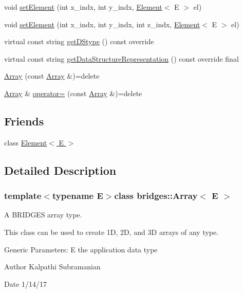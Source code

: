 \begin{DoxyCompactItemize}
void \hyperlink{classbridges_1_1_array_a428cc76d22af71c5ae57dc293780b8ec}{set\+Element} (int x\+\_\+indx, int y\+\_\+indx, \hyperlink{classbridges_1_1_element}{Element}$<$ E $>$ el)
\item 
void \hyperlink{classbridges_1_1_array_a526c3a190b48a338541e5b4667c5eedf}{set\+Element} (int x\+\_\+indx, int y\+\_\+indx, int z\+\_\+indx, \hyperlink{classbridges_1_1_element}{Element}$<$ E $>$ el)
\item 
virtual const string \hyperlink{classbridges_1_1_array_afe4174bc21eaafa316584894cf4732b1}{get\+D\+Stype} () const  override
\item 
virtual const string \hyperlink{classbridges_1_1_array_ab36ecc0c559ac5646fe52ec8ea1a19e4}{get\+Data\+Structure\+Representation} () const  override final
\item 
\hyperlink{classbridges_1_1_array_a3229045173ac984ca452e613b1ce1fa3}{Array} (const \hyperlink{classbridges_1_1_array}{Array} \&)=delete
\item 
\hyperlink{classbridges_1_1_array}{Array} \& \hyperlink{classbridges_1_1_array_af8a8b4fc43f57020db39207c80403e6f}{operator=} (const \hyperlink{classbridges_1_1_array}{Array} \&)=delete
\end{DoxyCompactItemize}
\subsection*{Friends}
\begin{DoxyCompactItemize}
\item 
class \hyperlink{classbridges_1_1_array_a8c6ff2a8dd3e27346dd25f588a78828a}{Element$<$ E $>$}
\end{DoxyCompactItemize}


\subsection{Detailed Description}
\subsubsection*{template$<$typename E$>$class bridges\+::\+Array$<$ E $>$}

A B\+R\+I\+D\+G\+E\+S array type. 

This class can be used to create 1\+D, 2\+D, and 3\+D arrays of any type.

Generic Parameters\+: E the application data type

\begin{DoxyAuthor}{Author}
Kalpathi Subramanian 
\end{DoxyAuthor}
\begin{DoxyDate}{Date}
1/14/17 
\end{DoxyDate}


